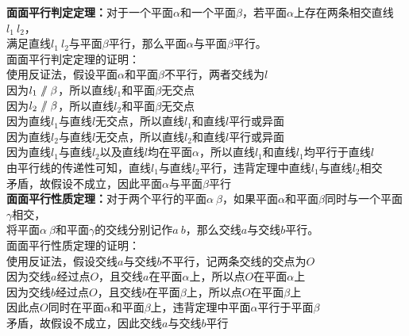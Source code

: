 \documentclass[UTF8]{ctexart}
\renewcommand\parallel{{\hspace{3.0pt}\mathrel{/\mskip-6.5mu/}\hspace{2.6pt}}}
\begin{document}
\newpage

    \textbf{面面平行判定定理：}对于一个平面$\alpha$和一个平面$\beta$，若平面$\alpha$上存在两条相交直线$l_1~l_2$，\\
    满足直线$l_1~l_2$与平面$\beta$平行，那么平面$\alpha$与平面$\beta$平行。\\[4mm]
    面面平行判定定理的证明：\\[3mm]
    使用反证法，假设平面$\alpha$和平面$\beta$不平行，两者交线为$l$\\[3mm]
    因为$l_1\parallel\beta$，所以直线$l_1$和平面$\beta$无交点\\[3mm]
    因为$l_2\parallel\beta$，所以直线$l_2$和平面$\beta$无交点\\[3mm]
    因为直线$l_1$与直线$l$无交点，所以直线$l_1$和直线$l$平行或异面\\[3mm]
    因为直线$l_2$与直线$l$无交点，所以直线$l_2$和直线$l$平行或异面\\[3mm]
    因为直线$l_1$与直线$l_2$以及直线$l$均在平面$\alpha$，所以直线$l_1$和直线$l_1$均平行于直线$l$\\[3mm]
    由平行线的传递性可知，直线$l_1$与直线$l_2$平行，违背定理中直线$l_1$与直线$l_2$相交\\[3mm]
    矛盾，故假设不成立，因此平面$\alpha$与平面$\beta$平行\\[10mm]
    \textbf{面面平行性质定理：}对于两个平行的平面$\alpha~\beta$，如果平面$\alpha$和平面$\beta$同时与一个平面$\gamma$相交，\\
    将平面$\alpha~\beta$和平面$\gamma$的交线分别记作$a~b$，那么交线$a$与交线$b$平行。\\[4mm]
    面面平行性质定理的证明：\\[3mm]
    使用反证法，假设交线$a$与交线$b$不平行，记两条交线的交点为$O$\\[3mm]
    因为交线$a$经过点$O$，且交线$a$在平面$\alpha$上，所以点$O$在平面$\alpha$上\\[3mm]
    因为交线$b$经过点$O$，且交线$b$在平面$\beta$上，所以点$O$在平面$\beta$上\\[3mm]
    因此点$O$同时在平面$\alpha$和平面$\beta$上，违背定理中平面$\alpha$平行于平面$\beta$\\[3mm]
    矛盾，故假设不成立，因此交线$a$与交线$b$平行

\newpage
\end{document}
